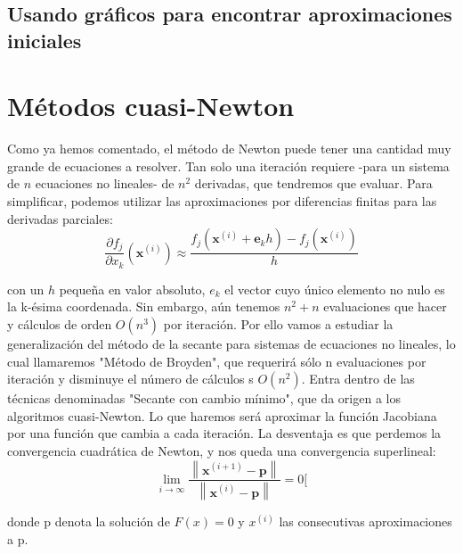 \subsection{Usando gráficos para encontrar aproximaciones iniciales}


\section{Métodos cuasi-Newton}

Como ya hemos comentado, el método de Newton puede tener una cantidad muy grande de ecuaciones a resolver. Tan solo una iteración requiere -para un sistema de $n$ ecuaciones no lineales- de $n^2$ derivadas, que tendremos que evaluar.
Para simplificar, podemos utilizar las aproximaciones por diferencias finitas para las derivadas parciales:
\[\frac{\partial f_{j}}{\partial x_{k}}\left(\mathbf{x}^{(i)}\right) \approx \frac{f_{j}\left(\mathbf{x}^{(i)}+\mathbf{e}_{k} h\right)-f_{j}\left(\mathbf{x}^{(i)}\right)}{h}\]

con un $h$ pequeña en valor absoluto, $e_k$ el vector cuyo único elemento no nulo es la k-ésima coordenada.
Sin embargo, aún tenemos $n^2 + n$ evaluaciones que hacer y cálculos de orden $O(n^3)$ por iteración.
Por ello vamos a estudiar la generalización del método de la secante para sistemas de ecuaciones no lineales, lo cual llamaremos "Método de Broyden", que requerirá sólo n evaluaciones por iteración y disminuye el número de cálculos s $O(n^2)$. Entra dentro de las técnicas denominadas "Secante con cambio mínimo", que da origen a los algoritmos cuasi-Newton.
Lo que haremos será aproximar la función Jacobiana por una función que cambia a cada iteración. La desventaja es que perdemos la convergencia cuadrática de Newton, y nos queda una convergencia superlineal:
\[\lim _{i \rightarrow \infty} \frac{\left\|\mathbf{x}^{(i+1)}-\mathbf{p}\right\|}{\left\|\mathbf{x}^{(i)}-\mathbf{p}\right\|}=0[\]

donde p denota la solución de $F(x) = 0$ y $x^(i)$ las consecutivas aproximaciones a p.


